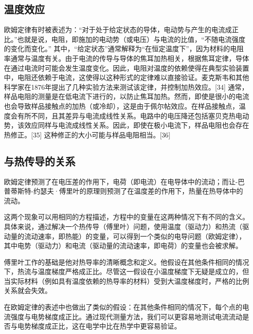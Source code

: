 \subsection{温度效应}  
欧姆定律有时被表述为：“对于处于给定状态的导体，电动势与产生的电流成正比。”也就是说，电阻，即施加的电动势（或电压）与电流的比值，“不随电流强度的变化而变化。” 其中，“给定状态”通常解释为“在恒定温度下”，因为材料的电阻率通常与温度有关。由于电流的传导与导体的焦耳加热相关，根据焦耳定律，导体在通过电流时可能会发生温度变化。因此，电阻对温度的依赖使得在典型实验装置中，电阻还依赖于电流，这使得以这种形式的定律难以直接验证。麦克斯韦和其他科学家在1876年提出了几种实验方法来测试该定律，并控制加热效应。[34] 通常，样品电阻的测量是在低电流下进行的，以防止焦耳加热。然而，即使是很小的电流也会导致样品接触点的加热（或冷却），这是由于佩尔帖效应。在样品接触点，温度会有所不同，且其差异与电流成线性关系。电路中的电压降还包括塞贝克热电动势，该效应同样与电流成线性关系。因此，即使在极小电流下，样品电阻也会存在热修正。[35] 这种修正的大小可能与样品电阻相当。[36]
\subsection{与热传导的关系}  
欧姆定律预测了在电压差的作用下，电荷（即电流）在电导体中的流动；而让-巴普蒂斯特-约瑟夫·傅里叶的原理则预测了在温度差的作用下，热量在热导体中的流动。

这两个现象可以用相同的方程描述，方程中的变量在这两种情况下有不同的含义。具体来说，通过解决一个热传导（傅里叶）问题，使用温度（驱动力）和热流（驱动量的流动速率，即热能）的变量，可以得到一个类似的电导问题（欧姆定律），其中电势（驱动力）和电流（驱动量的流动速率，即电荷）的变量也会被求解。

傅里叶工作的基础是他对热导率的清晰概念和定义。他假设在其他条件相同的情况下，热流与温度梯度严格成正比。尽管这一假设在小温度梯度下无疑是成立的，但当实际材料（例如具有温度依赖的热导率的材料）受到大温度梯度时，严格的比例关系就会失效。

在欧姆定律的表述中也做出了类似的假设：在其他条件相同的情况下，每个点的电流强度与电势梯度成正比。通过现代测量方法，我们可以更容易地测试电流流动是否与电势梯度成正比，这在电学中比在热学中更容易验证。
